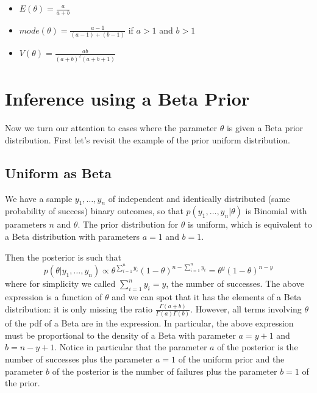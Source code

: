 \documentclass[
]{book}
\begin{document}
\begin{itemize}
\item
  \(E(\theta)=\frac{a}{a+b}\)
\item
  \(mode(\theta)=\frac{a-1}{(a-1)+(b-1)}\) if \(a>1\) and \(b>1\)
\item
  \(V(\theta)= \frac{ab}{(a+b)^2(a+b+1)}\)
\end{itemize}

\hypertarget{inference-using-a-beta-prior}{%
\section{Inference using a Beta Prior}\label{inference-using-a-beta-prior}}

Now we turn our attention to cases where the parameter \(\theta\) is given a Beta prior distribution. First let's revisit the example of the prior uniform distribution.

\hypertarget{uniform-as-beta}{%
\subsection{Uniform as Beta}\label{uniform-as-beta}}

We have a sample \(y_1,\dots, y_n\) of independent and identically distributed (same probability of success) binary outcomes, so that \(p(y_1,\dots,y_n|\theta)\) is Binomial with parameters \(n\) and \(\theta\). The prior distribution for \(\theta\) is uniform, which is equivalent to a Beta distribution with parameters \(a=1\) and \(b=1\).

Then the posterior is such that
\begin{equation}
p(\theta|y_1,\dots,y_n) \propto \theta^{\sum_{i=1}^ny_i}(1-\theta)^{n-\sum_{i=1}^ny_i} =\theta^y(1-\theta)^{n-y}
 \label{eq:betapost}
\end{equation}
where for simplicity we called \(\sum_{i=1}^ny_i=y\), the number of successes. The above expression is a function of \(\theta\) and we can spot that it has the elements of a Beta distribution: it is only missing the ratio \(\frac{\Gamma(a+b)}{\Gamma(a)\Gamma(b)}\). However, all terms involving \(\theta\) of the pdf of a Beta are in the expression. In particular, the above expression must be proportional to the density of a Beta with parameter \(a= y+1\) and \(b= n-y +1\). Notice in particular that the parameter \(a\) of the posterior is the number of successes plus the parameter \(a=1\) of the uniform prior and the parameter \(b\) of the posterior is the number of failures plus the parameter \(b=1\) of the prior.
\end{document}
